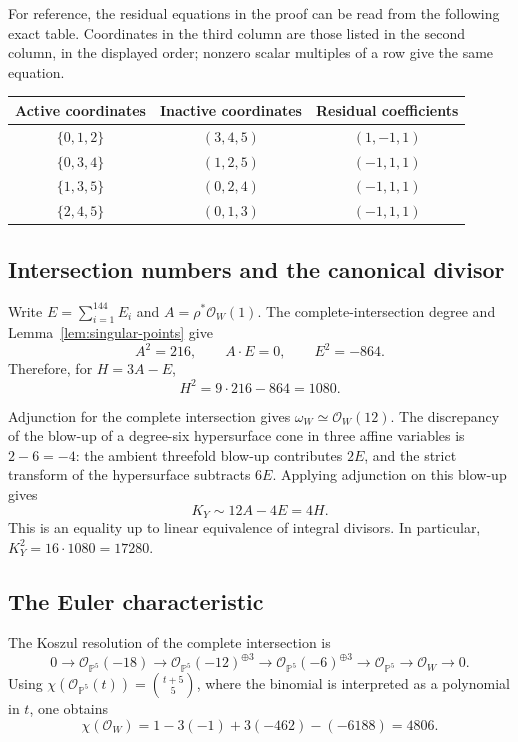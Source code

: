 \documentclass[11pt,reqno]{amsart}
\numberwithin{equation}{section}
\theoremstyle{definition}
\theoremstyle{remark}
\newcommand{\PP}{\mathbb P}
\newcommand{\OO}{\mathcal O}
\begin{document}
For reference, the residual equations in the proof can be read from
the following exact table. Coordinates in the third column are those
listed in the second column, in the displayed order; nonzero scalar
multiples of a row give the same equation.
\begin{center}
\begin{tabular}{ccc}
\toprule
Active coordinates & Inactive coordinates & Residual coefficients\\
\midrule
$\{0,1,2\}$ & $(3,4,5)$ & $(1,-1,1)$\\
$\{0,3,4\}$ & $(1,2,5)$ & $(-1,1,1)$\\
$\{1,3,5\}$ & $(0,2,4)$ & $(-1,1,1)$\\
$\{2,4,5\}$ & $(0,1,3)$ & $(-1,1,1)$\\
\bottomrule
\end{tabular}
\end{center}

\subsection{Intersection numbers and the canonical divisor}
Write $E=\sum_{i=1}^{144}E_i$ and $A=\rho^*\OO_W(1)$.
The complete-intersection degree and Lemma~\ref{lem:singular-points}
give
\begin{equation}\label{eq:intersection-data}
 A^2=216,\qquad A\cdot E=0,\qquad E^2=-864.
\end{equation}
Therefore, for $H=3A-E$,
\begin{equation}\label{eq:H-square}
 H^2=9\cdot216-864=1080.
\end{equation}

Adjunction for the complete intersection gives
$\omega_W\simeq\OO_W(12)$.
The discrepancy of the blow-up of a degree-six hypersurface cone in
three affine variables is $2-6=-4$: the ambient threefold blow-up
contributes $2E$, and the strict transform of the hypersurface
subtracts $6E$. Applying adjunction on this blow-up gives
\begin{equation}\label{eq:canonical-example}
 K_Y\sim12A-4E=4H.
\end{equation}
This is an equality up to linear equivalence of integral divisors.
In particular, $K_Y^2=16\cdot1080=17280$.

\subsection{The Euler characteristic}
The Koszul resolution of the complete intersection is
\[
 0\longrightarrow\OO_{\PP^5}(-18)
 \longrightarrow\OO_{\PP^5}(-12)^{\oplus3}
 \longrightarrow\OO_{\PP^5}(-6)^{\oplus3}
 \longrightarrow\OO_{\PP^5}
 \longrightarrow\OO_W\longrightarrow0.
\]
Using $\chi(\OO_{\PP^5}(t))=\binom{t+5}{5}$, where the binomial is
interpreted as a polynomial in $t$, one obtains
\begin{equation}\label{eq:chiW}
 \chi(\OO_W)
   =1-3(-1)+3(-462)-(-6188)=4806.
\end{equation}
\end{document}
